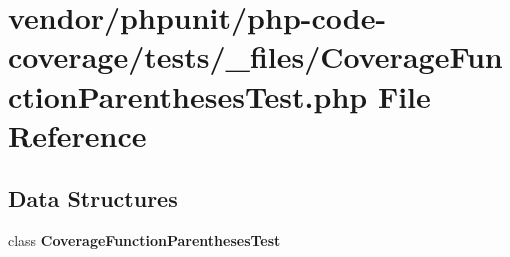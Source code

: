 \section{vendor/phpunit/php-\/code-\/coverage/tests/\+\_\+files/\+Coverage\+Function\+Parentheses\+Test.php File Reference}
\label{php-code-coverage_2tests_2__files_2_coverage_function_parentheses_test_8php}
\subsection*{Data Structures}
\begin{DoxyCompactItemize}
\item 
class {\bf Coverage\+Function\+Parentheses\+Test}
\end{DoxyCompactItemize}
